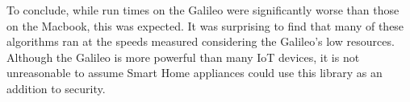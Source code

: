 To conclude, while run times on the Galileo were significantly worse than those on the Macbook, this was expected.  It was surprising to find that many of these algorithms ran at the speeds measured considering the Galileo's low resources. Although the Galileo is more powerful than many IoT devices, it is not unreasonable to assume Smart Home appliances could use this library as an addition to security.
